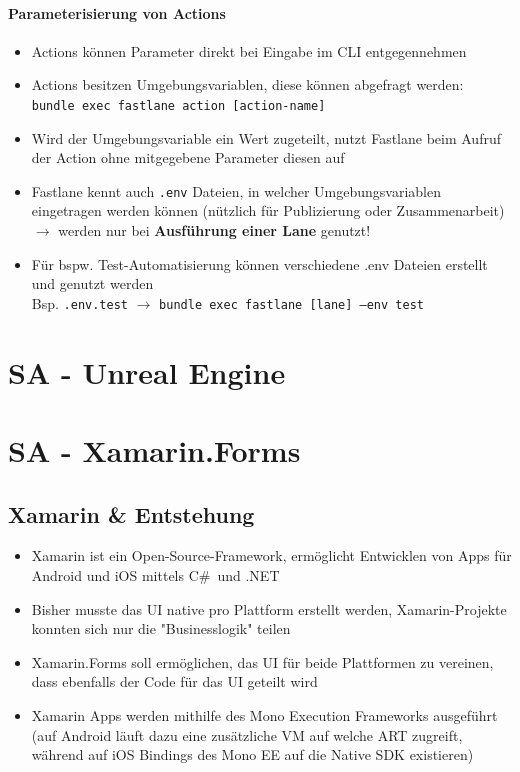 \documentclass[a4paper]{article}
\begin{document}
		\paragraph{Parameterisierung von Actions}
		\begin{itemize}
			\item Actions können Parameter direkt bei Eingabe im CLI entgegennehmen
			\item Actions besitzen Umgebungsvariablen, diese können abgefragt werden: \\
				\texttt{bundle exec fastlane action [action-name]}
			\item Wird der Umgebungsvariable ein Wert zugeteilt, nutzt Fastlane beim Aufruf der Action ohne mitgegebene Parameter diesen auf
			\item Fastlane kennt auch \texttt{.env} Dateien, in welcher Umgebungsvariablen eingetragen werden können (nützlich für Publizierung oder Zusammenarbeit) $\rightarrow$ werden nur bei \textbf{Ausführung einer Lane} genutzt!
			\item Für bspw. Test-Automatisierung können verschiedene .env Dateien erstellt und genutzt werden \\
				Bsp. \texttt{.env.test} $\rightarrow$ \texttt{bundle exec fastlane [lane] --env test}
		\end{itemize}
	
	\section{SA - Unreal Engine}
	\label{section:unrealengine}
	
	
	\section{SA - Xamarin.Forms}
	\label{section:xamarinforms}
	
		\subsection{Xamarin \& Entstehung}
	
		\begin{itemize}
			\item Xamarin ist ein Open-Source-Framework, ermöglicht Entwicklen von Apps für Android und iOS mittels C\# und .NET
			\item Bisher musste das UI native pro Plattform erstellt werden, Xamarin-Projekte konnten sich nur die "Businesslogik" teilen
			\item Xamarin.Forms soll ermöglichen, das UI für beide Plattformen zu vereinen, dass ebenfalls der Code für das UI geteilt wird
			\item Xamarin Apps werden mithilfe des Mono Execution Frameworks ausgeführt (auf Android läuft dazu eine zusätzliche VM auf welche ART zugreift, während auf iOS Bindings des Mono EE auf die Native SDK existieren)
		\end{itemize}
	
\end{document}
